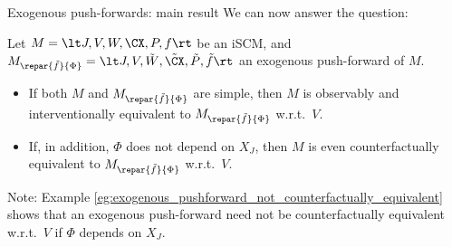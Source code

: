 \begin{frame}{Exogenous push-forwards: main result}
We can now answer the question:
\begin{Thm}[\ref{thm:various_equiv_exogenous_pushforward}]
  Let $M = \lt J, V, W, \CX, P, f \rt$ be an iSCM, and $M_{\repar{\tilde{f}}{\Phi}} = \lt J, V, \tilde{W}, \tilde{\CX}, \tilde{P}, \tilde{f} \rt$ an exogenous push-forward of $M$.

  \begin{itemize}
    \item If both $M$ and $M_{\repar{\tilde{f}}{\Phi}}$ are simple,
  then $M$ is observably and interventionally equivalent to $M_{\repar{\tilde{f}}{\Phi}}$ w.r.t.\ $V$.
    \item If, in addition, $\Phi$ does not depend on $X_J$, then $M$ is even counterfactually equivalent to $M_{\repar{\tilde{f}}{\Phi}}$ w.r.t.\ $V$.
  \end{itemize}
\end{Thm}

\bigskip
Note: Example \ref{eg:exogenous_pushforward_not_counterfactually_equivalent} shows that an exogenous push-forward need not be counterfactually equivalent w.r.t.\ $V$ if $\Phi$ depends on $X_J$.
\end{frame}

